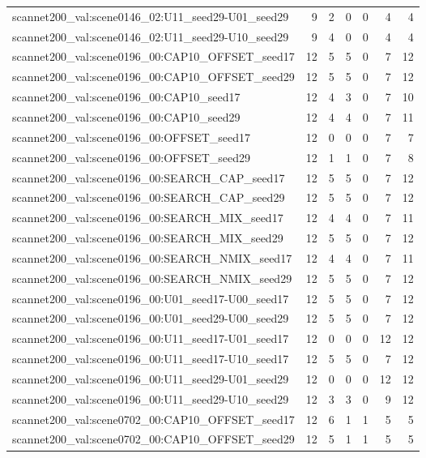 \begin{table}[t]
\begin{tabular}{lrrrrrr}
scannet200\_val:scene0146\_02:U11\_seed29-U01\_seed29 & 9 & 2 & 0 & 0 & 4 & 4 \\
scannet200\_val:scene0146\_02:U11\_seed29-U10\_seed29 & 9 & 4 & 0 & 0 & 4 & 4 \\
scannet200\_val:scene0196\_00:CAP10\_OFFSET\_seed17 & 12 & 5 & 5 & 0 & 7 & 12 \\
scannet200\_val:scene0196\_00:CAP10\_OFFSET\_seed29 & 12 & 5 & 5 & 0 & 7 & 12 \\
scannet200\_val:scene0196\_00:CAP10\_seed17 & 12 & 4 & 3 & 0 & 7 & 10 \\
scannet200\_val:scene0196\_00:CAP10\_seed29 & 12 & 4 & 4 & 0 & 7 & 11 \\
scannet200\_val:scene0196\_00:OFFSET\_seed17 & 12 & 0 & 0 & 0 & 7 & 7 \\
scannet200\_val:scene0196\_00:OFFSET\_seed29 & 12 & 1 & 1 & 0 & 7 & 8 \\
scannet200\_val:scene0196\_00:SEARCH\_CAP\_seed17 & 12 & 5 & 5 & 0 & 7 & 12 \\
scannet200\_val:scene0196\_00:SEARCH\_CAP\_seed29 & 12 & 5 & 5 & 0 & 7 & 12 \\
scannet200\_val:scene0196\_00:SEARCH\_MIX\_seed17 & 12 & 4 & 4 & 0 & 7 & 11 \\
scannet200\_val:scene0196\_00:SEARCH\_MIX\_seed29 & 12 & 5 & 5 & 0 & 7 & 12 \\
scannet200\_val:scene0196\_00:SEARCH\_NMIX\_seed17 & 12 & 4 & 4 & 0 & 7 & 11 \\
scannet200\_val:scene0196\_00:SEARCH\_NMIX\_seed29 & 12 & 5 & 5 & 0 & 7 & 12 \\
scannet200\_val:scene0196\_00:U01\_seed17-U00\_seed17 & 12 & 5 & 5 & 0 & 7 & 12 \\
scannet200\_val:scene0196\_00:U01\_seed29-U00\_seed29 & 12 & 5 & 5 & 0 & 7 & 12 \\
scannet200\_val:scene0196\_00:U11\_seed17-U01\_seed17 & 12 & 0 & 0 & 0 & 12 & 12 \\
scannet200\_val:scene0196\_00:U11\_seed17-U10\_seed17 & 12 & 5 & 5 & 0 & 7 & 12 \\
scannet200\_val:scene0196\_00:U11\_seed29-U01\_seed29 & 12 & 0 & 0 & 0 & 12 & 12 \\
scannet200\_val:scene0196\_00:U11\_seed29-U10\_seed29 & 12 & 3 & 3 & 0 & 9 & 12 \\
scannet200\_val:scene0702\_00:CAP10\_OFFSET\_seed17 & 12 & 6 & 1 & 1 & 5 & 5 \\
scannet200\_val:scene0702\_00:CAP10\_OFFSET\_seed29 & 12 & 5 & 1 & 1 & 5 & 5 \\

\end{tabular}
\end{table}
